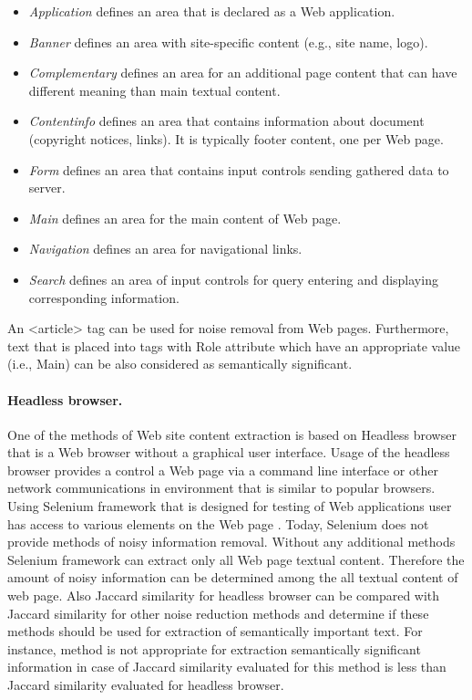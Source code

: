 \begin{itemize}
	\item \textit{Application} defines an area that is declared as a Web application.
	\item \textit{Banner} defines an area with site-specific content (e.g., site name, logo).
	\item \textit{Complementary} defines an area for an additional page content that can have different meaning than main textual content. 
	\item \textit{Contentinfo} defines an area that contains information about document (copyright notices, links). It is typically footer content, one per Web page.
	\item \textit{Form} defines an area that contains input controls sending gathered data to server.
	\item \textit{Main} defines an area for the main content of Web page.
	\item \textit{Navigation} defines an area for navigational links.
	\item \textit{Search} defines an area of input controls for query entering and displaying corresponding information.
\end{itemize}

An <article> tag can be used for noise removal from Web pages. Furthermore, text that is placed into tags with Role attribute which have an appropriate value (i.e., Main) can be also considered as semantically significant.

\paragraph{Headless browser.} One of the methods of Web site content extraction is based on Headless browser that is a Web browser without a graphical user interface. Usage of the headless browser provides a control a Web page via a command line interface or other network communications in environment that is similar to popular browsers. Using Selenium framework that is designed for testing of Web applications user has access to various elements on the Web page \cite{Sirotkin}. Today, Selenium does not provide methods of noisy information removal. Without any additional methods Selenium framework can extract only all Web page textual content. Therefore the amount of noisy information can be determined among the all textual content of web page. Also Jaccard similarity for headless browser can be compared with Jaccard similarity for other noise reduction methods and determine if these methods should be used for extraction of semantically important text. For instance, method is not appropriate for extraction semantically significant information in case of Jaccard similarity evaluated for this method is less than Jaccard similarity evaluated for headless browser.

